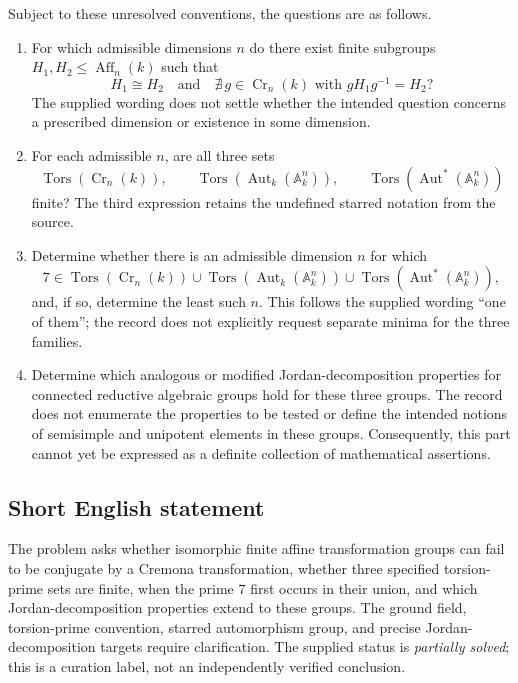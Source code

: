 \documentclass[11pt]{article}
\begin{document}
Subject to these unresolved conventions, the questions are as follows.
\begin{enumerate}
\item For which admissible dimensions \(n\) do there exist finite subgroups \(H_1,H_2\leq\operatorname{Aff}_n(k)\) such that
\[
H_1\cong H_2
\quad\text{and}\quad
\nexists\,g\in\operatorname{Cr}_n(k)\text{ with }gH_1g^{-1}=H_2?
\]
The supplied wording does not settle whether the intended question concerns a prescribed dimension or existence in some dimension.
\item For each admissible \(n\), are all three sets
\[
\operatorname{Tors}(\operatorname{Cr}_n(k)),\qquad
\operatorname{Tors}(\operatorname{Aut}_k(\mathbb A_k^n)),\qquad
\operatorname{Tors}(\operatorname{Aut}^*(\mathbb A_k^n))
\]
finite? The third expression retains the undefined starred notation from the source.
\item Determine whether there is an admissible dimension \(n\) for which
\[
7\in
\operatorname{Tors}(\operatorname{Cr}_n(k))
\cup\operatorname{Tors}(\operatorname{Aut}_k(\mathbb A_k^n))
\cup\operatorname{Tors}(\operatorname{Aut}^*(\mathbb A_k^n)),
\]
and, if so, determine the least such \(n\). This follows the supplied wording ``one of them''; the record does not explicitly request separate minima for the three families.
\item Determine which analogous or modified Jordan-decomposition properties for connected reductive algebraic groups hold for these three groups. The record does not enumerate the properties to be tested or define the intended notions of semisimple and unipotent elements in these groups. Consequently, this part cannot yet be expressed as a definite collection of mathematical assertions.
\end{enumerate}
\subsection{Short English statement}
The problem asks whether isomorphic finite affine transformation groups can fail to be conjugate by a Cremona transformation, whether three specified torsion-prime sets are finite, when the prime \(7\) first occurs in their union, and which Jordan-decomposition properties extend to these groups. The ground field, torsion-prime convention, starred automorphism group, and precise Jordan-decomposition targets require clarification. The supplied status is \emph{partially solved}; this is a curation label, not an independently verified conclusion.
\end{document}
